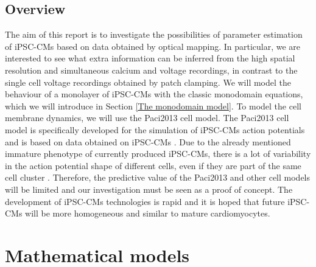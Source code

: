 \documentclass[12pt,a4paper]{article}
\begin{document}
\subsection{Overview}
The aim of this report is to investigate the possibilities of parameter estimation of iPSC-CMs based on data obtained by optical mapping. In particular, we are interested to see what extra information can be inferred from the high spatial resolution and simultaneous calcium and voltage recordings, in contrast to the single cell voltage recordings obtained by patch clamping. We will model the behaviour of a monolayer of iPSC-CMs with the classic monodomain equations, which we will introduce in Section \ref{The monodomain model}. To model the cell membrane dynamics, we will use the Paci2013 cell model. The Paci2013 cell model is specifically developed for the simulation of iPSC-CMs action potentials and is based on data obtained on iPSC-CMs \cite{Paci2013, Ma2011}. Due to the already mentioned immature phenotype of currently produced iPSC-CMs, there is a lot of variability in the action potential shape of different cells, even if they are part of the same cell cluster \cite{Blazeski, Zhu2016}. Therefore, the predictive value of the Paci2013 and other cell models will be limited and our investigation must be seen as a proof of concept. The development of iPSC-CMs technologies is rapid and it is hoped that future iPSC-CMs will be more homogeneous and similar to mature cardiomyocytes\cite{Denning2016}. 
%
\section{Mathematical models} \label{Mathematical models}
\end{document}

